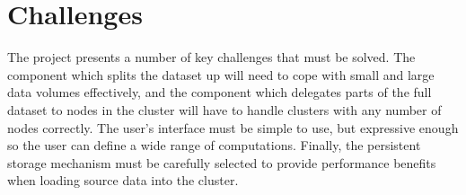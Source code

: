 \section{Challenges}
The project presents a number of key challenges that must be solved. The component which splits the dataset up will need to cope with small and large data volumes effectively, and the component which delegates parts of the full dataset to nodes in the cluster will have to handle clusters with any number of nodes correctly. The user's interface must be simple to use, but expressive enough so the user can define a wide range of computations. Finally, the persistent storage mechanism must be carefully selected to provide performance benefits when loading source data into the cluster.
